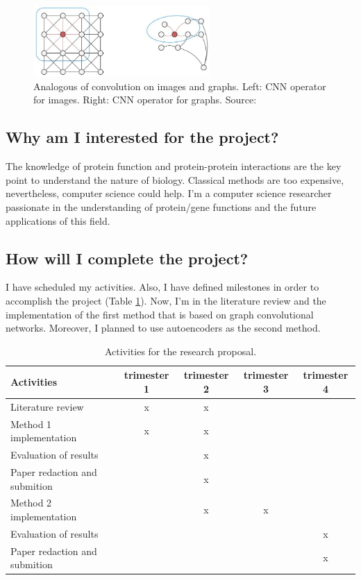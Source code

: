 \documentclass[a4paper]{article}
\begin{document}
\begin{figure}[hbt!]
	\centering
	\includegraphics[width=0.6\textwidth]{img/conv.jpg}
	\caption{Analogous of convolution on images and graphs. Left: CNN operator for images. Right: CNN operator for graphs. Source: \cite{Susha2019}}
	\label{fig:conv}
\end{figure}

\subsection{Why am I interested  for the project?}
The knowledge of protein function and protein-protein interactions are the key point to understand the nature of biology. Classical methods are too expensive, nevertheless, computer science could help. I'm a computer science researcher passionate in the understanding of protein/gene functions and the future applications of this field.

\subsection{How will I complete the project?}

I have scheduled my activities. Also, I have defined milestones in order to accomplish the project (Table \ref{tab:act}). Now, I'm in the literature review and the implementation of the first method that is based on graph convolutional networks. Moreover, I planned to use autoencoders as the second method.

\begin{table}[hbt!]
	\caption{Activities for the research proposal.}
	\label{tab:act}
	\begin{tabular}{lcccc}
		\hline
		Activities                      & trimester 1 & trimester 2 & trimester 3 & trimester 4 \\ \hline
		Literature review             & x          & x          &            &            \\
		Method 1 implementation       & x          & x          &            &            \\
		Evaluation of results         &            & x          &            &            \\
		Paper redaction and submition &            & x          &            &            \\
		Method 2 implementation       &            & x          & x          &            \\
		Evaluation of results         &            &            &            & x          \\
		Paper redaction and submition &            &            &            & x         \\ \hline
	\end{tabular}
\end{table}
\end{document}
